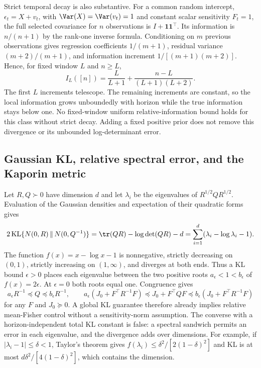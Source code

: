 Strict temporal decay is also substantive. For a common random intercept,
$\epsilon_t=X+v_t$, with $\Var(X)=\Var(v_t)=1$ and constant scalar
sensitivity $F_t=1$, the full selected covariance for $n$ observations is
$I+\boldsymbol1\boldsymbol1^\top$. Its information is $n/(n+1)$ by the
rank-one inverse formula. Conditioning on $m$ previous observations gives
regression coefficients $1/(m+1)$, residual variance $(m+2)/(m+1)$,
and information increment $1/[(m+1)(m+2)]$. Hence, for fixed window
$L$ and $n\ge L$,
\begin{equation}
 I_L([n])=\frac{L}{L+1}
              +\frac{n-L}{(L+1)(L+2)}.
 \label{eq:random-intercept-boundary}
\end{equation}
The first $L$ increments telescope. The remaining increments are constant,
so the local information grows unboundedly with horizon while the true
information stays below one. No fixed-window uniform relative-information
bound holds for this class without strict decay. Adding a fixed positive
prior does not remove this divergence or its unbounded log-determinant error.

\subsection{Gaussian KL, relative spectral error, and the Kaporin metric}
\label{app:locality-metrics}
Let $R,Q\succ0$ have dimension $d$ and let $\lambda_i$ be the eigenvalues
of $R^{1/2}QR^{1/2}$. Evaluation of the Gaussian densities and expectation
of their quadratic forms gives
\begin{equation}
 2\operatorname{KL}\{N(0,R)\,\|\,N(0,Q^{-1})\}
 =\tr(QR)-\log\det(QR)-d
 =\sum_{i=1}^d(\lambda_i-\log\lambda_i-1).
 \label{eq:kl-relative-identity}
\end{equation}
The function $f(x)=x-\log x-1$ is nonnegative, strictly decreasing on
$(0,1)$, strictly increasing on $(1,\infty)$, and diverges at both ends.
Thus a KL bound $\epsilon>0$ places each eigenvalue between the two
positive roots $a_\epsilon<1<b_\epsilon$ of $f(x)=2\epsilon$.
At $\epsilon=0$ both roots equal one. Congruence gives
\[
 a_\epsilon R^{-1}\preceq Q\preceq b_\epsilon R^{-1},\qquad
 a_\epsilon(J_0+F^\top R^{-1}F)
 \preceq J_0+F^\top QF
 \preceq b_\epsilon(J_0+F^\top R^{-1}F)
\]
for any $F$ and $J_0\succeq0$. A global KL guarantee therefore already
implies relative mean-Fisher control without a sensitivity-norm assumption.
The converse with a horizon-independent total KL constant is false:
a spectral sandwich permits an error in each eigenvalue, and the divergence
adds over dimensions. For example, if $|\lambda_i-1|\le\delta<1$,
Taylor's theorem gives $f(\lambda_i)\le\delta^2/[2(1-\delta)^2]$ and
KL is at most $d\delta^2/[4(1-\delta)^2]$, which contains the dimension.

